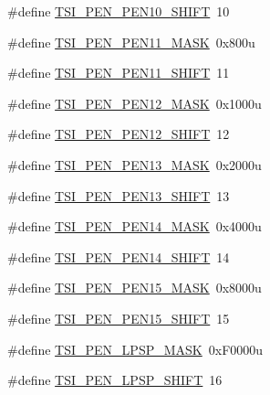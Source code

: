 \begin{DoxyCompactItemize}
\#define \hyperlink{group___t_s_i___register___masks_gae26e707910b5a4ed3a2bfc7397c7fdf8}{T\+S\+I\+\_\+\+P\+E\+N\+\_\+\+P\+E\+N10\+\_\+\+S\+H\+I\+FT}~10
\item 
\#define \hyperlink{group___t_s_i___register___masks_ga2692c92efabc1272aadd492fedaf8117}{T\+S\+I\+\_\+\+P\+E\+N\+\_\+\+P\+E\+N11\+\_\+\+M\+A\+SK}~0x800u
\item 
\#define \hyperlink{group___t_s_i___register___masks_ga7cf23edbaaf2d70825a3af3774076230}{T\+S\+I\+\_\+\+P\+E\+N\+\_\+\+P\+E\+N11\+\_\+\+S\+H\+I\+FT}~11
\item 
\#define \hyperlink{group___t_s_i___register___masks_ga686745e0ce974aeda129cb1ad92792b5}{T\+S\+I\+\_\+\+P\+E\+N\+\_\+\+P\+E\+N12\+\_\+\+M\+A\+SK}~0x1000u
\item 
\#define \hyperlink{group___t_s_i___register___masks_ga4e6356a9326382d6696b9249ad74ec3b}{T\+S\+I\+\_\+\+P\+E\+N\+\_\+\+P\+E\+N12\+\_\+\+S\+H\+I\+FT}~12
\item 
\#define \hyperlink{group___t_s_i___register___masks_ga47604061f85253c63ae3846adea3f36a}{T\+S\+I\+\_\+\+P\+E\+N\+\_\+\+P\+E\+N13\+\_\+\+M\+A\+SK}~0x2000u
\item 
\#define \hyperlink{group___t_s_i___register___masks_gaa2beb25ccfcccb7bb0032fa6f42b80f7}{T\+S\+I\+\_\+\+P\+E\+N\+\_\+\+P\+E\+N13\+\_\+\+S\+H\+I\+FT}~13
\item 
\#define \hyperlink{group___t_s_i___register___masks_gaa4403e6fd78c53717c22d34c9d082d8c}{T\+S\+I\+\_\+\+P\+E\+N\+\_\+\+P\+E\+N14\+\_\+\+M\+A\+SK}~0x4000u
\item 
\#define \hyperlink{group___t_s_i___register___masks_ga20c8a6fee93df97db5d2191bd6d72b09}{T\+S\+I\+\_\+\+P\+E\+N\+\_\+\+P\+E\+N14\+\_\+\+S\+H\+I\+FT}~14
\item 
\#define \hyperlink{group___t_s_i___register___masks_ga1cbf93a7b5646316b3013106b096951c}{T\+S\+I\+\_\+\+P\+E\+N\+\_\+\+P\+E\+N15\+\_\+\+M\+A\+SK}~0x8000u
\item 
\#define \hyperlink{group___t_s_i___register___masks_ga06472a71ff605b918f36b6dd770bff9c}{T\+S\+I\+\_\+\+P\+E\+N\+\_\+\+P\+E\+N15\+\_\+\+S\+H\+I\+FT}~15
\item 
\#define \hyperlink{group___t_s_i___register___masks_ga5c60f0233573e0a5436a8bf87600d347}{T\+S\+I\+\_\+\+P\+E\+N\+\_\+\+L\+P\+S\+P\+\_\+\+M\+A\+SK}~0x\+F0000u
\item 
\#define \hyperlink{group___t_s_i___register___masks_ga8a4314c8664c97a0304050452d85779b}{T\+S\+I\+\_\+\+P\+E\+N\+\_\+\+L\+P\+S\+P\+\_\+\+S\+H\+I\+FT}~16
\item 

\end{DoxyCompactItemize}
